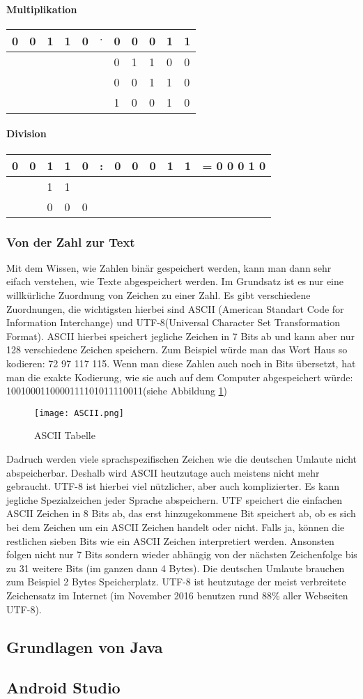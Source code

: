 \paragraph{Multiplikation}
\begin{tabular}{lllllllllll}
0&0&1&1&0& $\cdot$ &0&0&0&1&1 \\ \hline
&&&&&&0&1&1&0&0 \\
&&&&&&0&0&1&1&0 \\ \hline
&&&&&&1&0&0&1&0
\end{tabular}
\paragraph{Division}
\begin{tabular}{lllllllllll l}
0&0&1&1&0& : &0&0&0&1&1 & = 0 0 0 1 0 \\ \hline
 & &1&1& & &&&&&& \\ \cline{3-4}
 & &0&0&0& &&&&&& \\ 
\end{tabular}
\subsubsection{Von der Zahl zur Text}
Mit dem Wissen, wie Zahlen binär gespeichert werden, kann man dann sehr eifach verstehen, wie Texte abgespeichert werden. Im Grundsatz ist es nur eine willkürliche Zuordnung von Zeichen zu einer Zahl. Es gibt verschiedene Zuordnungen, die wichtigsten hierbei sind ASCII (American Standart Code for Information Interchange) und UTF-8(Universal Character Set Transformation Format). ASCII hierbei speichert jegliche Zeichen in 7 Bits ab und kann aber nur 128 verschiedene Zeichen speichern. Zum Beispiel würde man das Wort Haus so kodieren: 72 97 117 115. Wenn man diese Zahlen auch noch in Bits übersetzt, hat man die exakte Kodierung, wie sie auch auf dem Computer abgespeichert würde: 1001000110000111101011110011(siehe Abbildung \ref{fig:ASCII})
\begin{figure}[htbp] 
  \centering
     \texttt{[image: ASCII.png]}
  \caption{ASCII Tabelle \cite{ASCII}}
  \label{fig:ASCII}
\end{figure}
Dadruch werden viele sprachspezifischen Zeichen wie die deutschen Umlaute nicht abspeicherbar. Deshalb wird ASCII heutzutage auch meistens nicht mehr gebraucht. UTF-8 ist hierbei viel nützlicher, aber auch komplizierter. Es kann jegliche Spezialzeichen jeder Sprache abspeichern. UTF speichert die einfachen ASCII Zeichen in 8 Bits ab, das erst hinzugekommene Bit speichert ab, ob es sich bei dem Zeichen um ein ASCII Zeichen handelt oder nicht. Falls ja, können die restlichen sieben Bits wie ein ASCII Zeichen interpretiert werden. Ansonsten folgen nicht nur 7 Bits sondern wieder abhängig von der nächsten Zeichenfolge bis zu 31 weitere Bits (im ganzen dann 4 Bytes). Die deutschen Umlaute brauchen zum Beispiel 2 Bytes Speicherplatz. UTF-8 ist heutzutage der meist verbreitete Zeichensatz im Internet (im November 2016 benutzen rund 88\% aller Webseiten UTF-8). \cite{UTF-8}
\subsection{Grundlagen von Java}

\subsection{Android Studio}